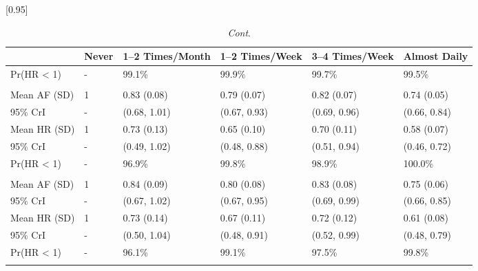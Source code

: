 \documentclass[nutrients,article,accept,moreauthors,pdftex]{Definitions/mdpi}
\begin{document}
\begin{table}[H]\ContinuedFloat

\caption{\textit{Cont}.}
\label{tab:tab2}
\centering
\fontsize{6}{8}\selectfont
\scalebox{.95}[0.95]{\begin{tabular}{L{32mm}C{8mm}C{26mm}C{25mm}C{25mm}C{20mm}}
\textbf{ } & \textbf{Never} & \textbf{1--2 Times/Month} & \textbf{1--2 Times/Week} & \textbf{3--4 Times/Week} & \textbf{Almost Daily}\\
\hline



\hspace{1em}Pr(HR < 1) & - & 99.1\% & 99.9\% & 99.7\% & 99.5\%\\
\addlinespace[0.3em]
\\
   \hspace{1em}Mean AF (SD) & 1 & 0.83 (0.08) & 0.79 (0.07) & 0.82 (0.07) & 0.74 (0.05)\\
\hspace{1em}95\% CrI & - & (0.68, 1.01) & (0.67, 0.93) & (0.69, 0.96) & (0.66, 0.84)\\
   \hspace{1em}Mean HR (SD) & 1 & 0.73 (0.13) & 0.65 (0.10) & 0.70 (0.11) & 0.58 (0.07)\\
\hspace{1em}95\% CrI & - & (0.49, 1.02) & (0.48, 0.88) & (0.51, 0.94) & (0.46, 0.72)\\
   \hspace{1em}Pr(HR < 1) & - & 96.9\% & 99.8\% & 98.9\% & 100.0\%\\
\addlinespace[0.3em]
\\
\hspace{1em}Mean AF (SD) & 1 & 0.84 (0.09) & 0.80 (0.08) & 0.83 (0.08) & 0.75 (0.06)\\
   \hspace{1em}95\% CrI & - & (0.67, 1.02) & (0.67, 0.95) & (0.69, 0.99) & (0.66, 0.85)\\
\hspace{1em}Mean HR (SD) & 1 & 0.73 (0.14) & 0.67 (0.11) & 0.72 (0.12) & 0.61 (0.08)\\
   \hspace{1em}95\% CrI & - & (0.50, 1.04) & (0.48, 0.91) & (0.52, 0.99) & (0.48, 0.79)\\
\hspace{1em}Pr(HR < 1) & - & 96.1\% & 99.1\% & 97.5\% & 99.8\%\\


\end{tabular}}
\end{table}
\end{document}
